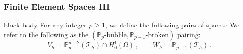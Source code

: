 \documentclass[aspectratio=169,xcolor=dvipsnames,11pt]{beamer}
\begin{document}
\begin{frame}\frametitle{Finite Element Spaces III}
\begin{minipage}{0.55\textwidth}
\begin{beamercolorbox}[rounded=true, shadow=true, wd=\textwidth]{block body}
For any integer $p \geq 1$, we define the following pairs of spaces:
\label{eq:SubspacePairs}
\smallskip
We refer to the following as the $(\mathbb{P}_p\text{-bubble},\mathbb{P}_{p-1}\text{-broken})$ pairing:
\begin{equation*}
\label{eq:SubspacePair1}
	V_h = \mathbb{P}_{p}^{p+2}(\mathcal{T}_h)\cap H^1_0(\Omega)
	\,,\qquad
	W_h = \mathbb{P}_{p-1}(\mathcal{T}_h)
	\,.
\end{equation*}
%
\end{beamercolorbox}
\end{minipage}\hfill{}


\end{frame}
\end{document}

